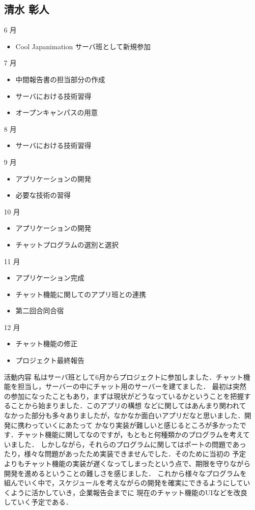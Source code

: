 \subsection{清水 彰人}
6 月
\begin{itemize}
\item Cool Japanimation サーバ班として新規参加
\end{itemize}
7 月
\begin{itemize}
\item 中間報告書の担当部分の作成
\item サーバにおける技術習得
\item オープンキャンパスの用意
\end{itemize}
8 月
\begin{itemize}
\item サーバにおける技術習得
\end{itemize}
9 月
\begin{itemize}
\item アプリケーションの開発
\item 必要な技術の習得
\end{itemize}
10 月
\begin{itemize}
\item アプリケーションの開発
\item チャットプログラムの選別と選択
\end{itemize}
11 月
\begin{itemize}
\item アプリケーション完成
\item チャット機能に関してのアプリ班との連携
\item 第二回合同合宿
\end{itemize}
12 月
\begin{itemize}
\item チャット機能の修正
\item プロジェクト最終報告
\end{itemize}
\per
活動内容
  私はサーバ班として6月からプロジェクトに参加しました．チャット機能を担当し，サーバーの中にチャット用のサーバーを建てました．
  最初は突然の参加になったこともあり，まずは現状がどうなっているかということを把握することから始まりました．このアプリの構想
  などに関してはあんまり関われてなかった部分も多々ありましたが，なかなか面白いアプリだなと思いました．開発に携わっていくにあたって
  かなり実装が難しいと感じるところが多かったです．チャット機能に関してなのですが，もともと何種類かのプログラムを考えていました．
  しかしながら，それらのプログラムに関してはポートの問題であったり，様々な問題があったため実装できませんでした．そのために当初の
  予定よりもチャット機能の実装が遅くなってしまったという点で、期限を守りながら開発を進めるということの難しさを感じました．
  これから様々なプログラムを組んでいく中で，スケジュールを考えながらの開発を確実にできるようにしていくように活かしていき，企業報告会までに
  現在のチャット機能のUIなどを改良していく予定である．
  
  
